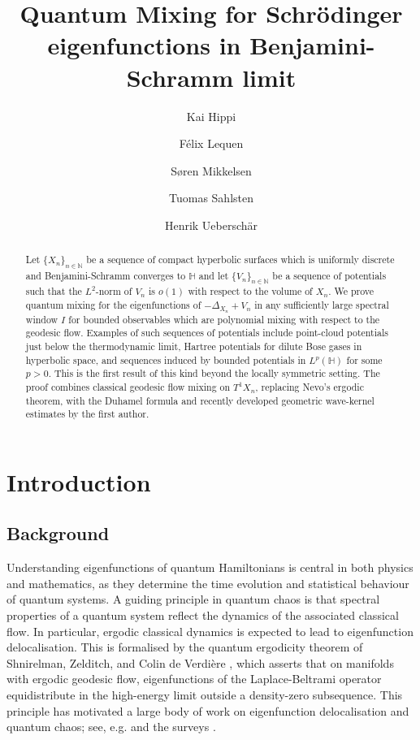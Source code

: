 \documentclass[11pt,twoside,reqno]{amsart}
\title{Quantum Mixing for Schr\"odinger eigenfunctions in Benjamini-Schramm limit}
\author{Kai Hippi}
\author{F\'{e}lix Lequen}
\author{S{\o}ren Mikkelsen}
\author{Tuomas Sahlsten}
\author{Henrik Uebersch\"{a}r}
\newcommand{\N}{\mathbb{N}}
\newcommand{\1}{\mathrm{\mathbf{1}}}
\numberwithin{equation}{section}
\theoremstyle{plain}
\theoremstyle{definition}
\theoremstyle{remark}
\begin{document}
\begin{abstract}
Let $\{X_n\}_{n\in\N}$ be a  sequence of compact hyperbolic surfaces which is uniformly discrete and Benjamini-Schramm converges to $\mathbb{H}$ and let $\{V_n\}_{n\in\N}$ be a sequence of potentials such that the $L^2$-norm of $V_n$ is $o(1)$ with respect to the volume of $X_n$. We prove quantum mixing for the eigenfunctions of $-\Delta_{X_n}+V_n$ in any sufficiently large spectral window $I$ for bounded observables which are polynomial mixing with respect to the geodesic flow. Examples of such sequences of potentials include point-cloud potentials just below the thermodynamic limit, Hartree potentials for dilute Bose gases in hyperbolic space, and sequences induced by bounded potentials in $L^p(\mathbb{H})$ for some $p>0$. This is the first result of this kind beyond the locally symmetric setting. The proof combines classical geodesic flow mixing on $T^1X_n$, replacing Nevo's ergodic theorem, with the Duhamel formula and recently developed geometric wave-kernel estimates by the first author.
\end{abstract}

\maketitle



\section{Introduction}

\subsection{Background}

Understanding eigenfunctions of quantum Hamiltonians is central in both physics and mathematics, as they determine the time evolution and statistical behaviour of quantum systems. A guiding principle in quantum chaos is that spectral properties of a quantum system reflect the dynamics of the associated classical flow. In particular, ergodic classical dynamics is expected to lead to eigenfunction delocalisation. This is formalised by the quantum ergodicity theorem of Shnirelman, Zelditch, and Colin de Verdi\`ere \cite{shnirelmanErgodicPropertiesEigenfunctions,zelditchUniformDistributionEigenfunctions1987,colindeverdiereErgodiciteFonctionsPropres1985}, which asserts that on manifolds with ergodic geodesic flow, eigenfunctions of the Laplace-Beltrami operator equidistribute in the high-energy limit outside a density-zero subsequence. This principle has motivated a large body of work on eigenfunction delocalisation and quantum chaos; see, e.g. \cite{Anantharaman2008,AnantharamanNonnenmacher2007,Lindenstrauss2006,Soundararajan2010,DyatlovZahl2016,DyatlovJin2021} and the surveys \cite{Anantharaman2022,Dyatlov2022}.
\end{document}
